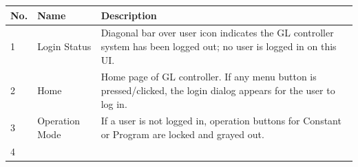\begin{longtable}[]{@{}|l|l|l|@{}}
\toprule
\rowcolor{brown}\begin{minipage}[b]{0.04\columnwidth}\raggedright
{\bf{No.}}\strut
\end{minipage} & \begin{minipage}[b]{0.23\columnwidth}\raggedright
{\bf{Name}}\strut
\end{minipage} & \begin{minipage}[b]{0.65\columnwidth}\raggedright
{\bf{Description}}\strut
\end{minipage}\tabularnewline
\midrule
\endhead
\begin{minipage}[t]{0.04\columnwidth}\raggedright
1\strut
\end{minipage} & \begin{minipage}[t]{0.23\columnwidth}\raggedright
Login Status\strut
\end{minipage} & \begin{minipage}[t]{0.65\columnwidth}\raggedright
Diagonal bar over user icon indicates the GL controller system has been
logged out; no user is logged in on this UI.\strut
\end{minipage}\tabularnewline
\begin{minipage}[t]{0.04\columnwidth}\raggedright
2\strut
\end{minipage} & \begin{minipage}[t]{0.23\columnwidth}\raggedright
Home\strut
\end{minipage} & \begin{minipage}[t]{0.65\columnwidth}\raggedright
Home page of GL controller. If any menu button is pressed/clicked, the
login dialog appears for the user to log in.\strut
\end{minipage}\tabularnewline
\begin{minipage}[t]{0.04\columnwidth}\raggedright
3\strut
\end{minipage} & \begin{minipage}[t]{0.23\columnwidth}\raggedright
Operation Mode\strut
\end{minipage} & \begin{minipage}[t]{0.65\columnwidth}\raggedright
If a user is not logged in, operation buttons for Constant or Program
are locked and grayed out.\strut
\end{minipage}\tabularnewline
\begin{minipage}[t]{0.04\columnwidth}\raggedright
4\strut
\end{minipage} & \begin{minipage}[t]{0.23\columnwidth}\raggedright

\end{minipage}
\end{longtable}
